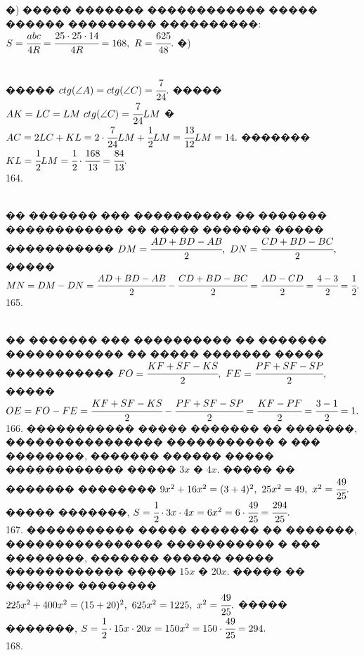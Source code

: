\documentclass[12pt]{article}
\begin{document}
�) ����� ������� ������������ ����� ������ ��������� ����������: $S=\cfrac{abc}{4R}=\cfrac{25\cdot25\cdot14}{4R}=168,\ R=\cfrac{625}{48}.$\newpage\noindent
�) \begin{figure}[ht!]
\end{figure}\\
����� $ctg(\angle A)=ctg(\angle C)=\cfrac{7}{24}.$ ����� $AK=LC=LM\ ctg(\angle C)=\cfrac{7}{24}LM$ � $AC=2LC+KL=2\cdot\cfrac{7}{24}LM+\cfrac{1}{2}LM=\cfrac{13}{12}LM=14.$ ������� $KL=\cfrac{1}{2}LM=\cfrac{1}{2}\cdot\cfrac{168}{13}=\cfrac{84}{13}.$\\
164. \begin{figure}[ht!]
\end{figure}\\
�� ������� ��� ���������� �� ������� ������������ �� ����� ������� ����� ����������� $DM=\cfrac{AD+BD-AB}{2},\ DN=\cfrac{CD+BD-BC}{2},$ �����\\
$MN=DM-DN=\cfrac{AD+BD-AB}{2}-\cfrac{CD+BD-BC}{2}=\cfrac{AD-CD}{2}=\cfrac{4-3}{2}=\cfrac{1}{2}.$\\
165. \begin{figure}[ht!]
\end{figure}\\
�� ������� ��� ���������� �� ������� ������������ �� ����� ������� ����� ����������� $FO=\cfrac{KF+SF-KS}{2},\ FE=\cfrac{PF+SF-SP}{2},$ �����\\
$OE=FO-FE=\cfrac{KF+SF-KS}{2}-\cfrac{PF+SF-SP}{2}=\cfrac{KF-PF}{2}=\cfrac{3-1}{2}=1.$\\
166. ����������� ����� ������� �� �������, ���������������� ����������� � ��� ��������, ������� ������ ����� ������������ ����� $3x$ � $4x.$ ����� �� ������� �������� $9x^2+16x^2=(3+4)^2,\ 25x^2=49,\ x^2=\cfrac{49}{25}.$ ����� �������, $S=\cfrac{1}{2}\cdot3x\cdot4x=6x^2=6\cdot\cfrac{49}{25}=\cfrac{294}{25}.$\\
167. ����������� ����� ������� �� �������, ���������������� ����������� � ��� ��������, ������� ������ ����� ������������ ����� $15x$ � $20x.$ ����� �� ������� �������� $225x^2+400x^2=(15+20)^2,\ 625x^2=1225,\ x^2=\cfrac{49}{25}.$ ����� �������, $S=\cfrac{1}{2}\cdot15x\cdot20x=150x^2=150\cdot\cfrac{49}{25}=294.$\\
168. \begin{figure}[ht!]
\end{figure}\\
\end{document}
